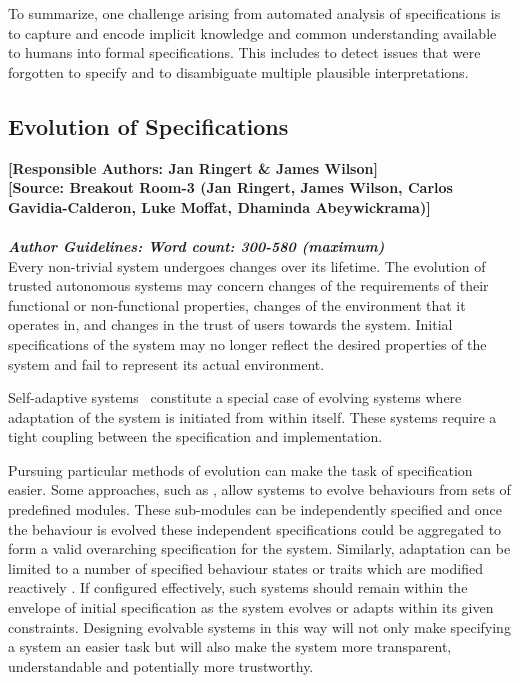\documentclass[sigconf]{acmart}
\begin{document}
To summarize, one challenge arising from automated analysis of specifications is to capture and encode implicit knowledge and common understanding available to humans into formal specifications. This includes to detect issues that were forgotten to specify 
and to disambiguate multiple plausible interpretations.

\subsection{Evolution of Specifications}
\noindent\textbf{[Responsible Authors:  Jan Ringert \& James Wilson]}\\
\noindent \textbf{[Source: Breakout Room-3 (Jan Ringert, James Wilson, Carlos Gavidia-Calderon, Luke Moffat, Dhaminda Abeywickrama)]}\\\\
\noindent\textbf{\textit{Author Guidelines: Word count: 300-580 (maximum)}}\\

Every non-trivial system undergoes changes over its lifetime. The evolution of trusted autonomous systems may concern changes of the requirements of their functional or non-functional properties, changes of the environment that it operates in, and changes in the trust of users towards the system. Initial specifications of the system may no longer reflect the desired properties of the system and fail to represent its actual environment.

Self-adaptive systems~\cite{SalehieT09} constitute a special case of evolving systems where adaptation of the system is initiated from within itself. These systems require a tight coupling between the specification and implementation.

Pursuing particular methods of evolution can make the task of specification easier. Some approaches, such as \cite{francesca2014automode}, allow systems to evolve behaviours from sets of predefined modules. These sub-modules can be independently specified and once the behaviour is evolved these independent specifications could be aggregated to form a valid overarching specification for the system. Similarly, adaptation can be limited to a number of specified behaviour states or traits which are modified reactively \cite{wilson2019amalgamation}. If configured effectively, such systems should remain within the envelope of initial specification as the system evolves or adapts within its given constraints. Designing evolvable systems in this way will not only make specifying a system an easier task but will also make the system more transparent, understandable and potentially more trustworthy.
\end{document}
